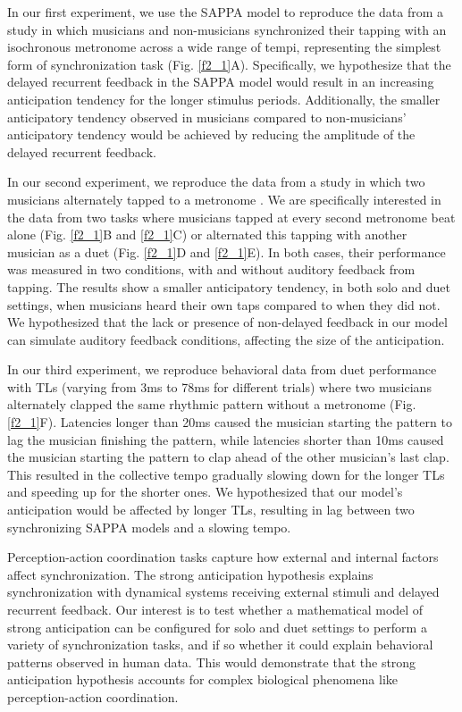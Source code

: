 \documentclass{report}
\begin{document}
In our first experiment, we use the SAPPA model to reproduce the data from a study in which musicians and non-musicians synchronized their tapping with an isochronous metronome across a wide range of tempi, representing the simplest form of synchronization task \cite{repp2007tapping} (Fig.{} \ref{f2_1}A). Specifically, we hypothesize that the delayed recurrent feedback in the SAPPA model would result in an increasing anticipation tendency for the longer stimulus periods. Additionally, the smaller anticipatory tendency observed in musicians compared to non-musicians' anticipatory tendency would be achieved by reducing the amplitude of the delayed recurrent feedback.

In our second experiment, we reproduce the data from a study in which two musicians alternately tapped to a metronome \cite{nowicki2013mutual}. We are specifically interested in the data from two tasks where musicians tapped at every second metronome beat alone (Fig.{} \ref{f2_1}B and \ref{f2_1}C) or alternated this tapping with another musician as a duet (Fig.{} \ref{f2_1}D and \ref{f2_1}E). In both cases, their performance was measured in two conditions, with and without auditory feedback from tapping. The results show a smaller anticipatory tendency, in both solo and duet settings, when musicians heard their own taps compared to when they did not. We hypothesized that the lack or presence of non-delayed feedback in our model can simulate auditory feedback conditions, affecting the size of the anticipation.

In our third experiment, we reproduce behavioral data from duet performance with TLs (varying from 3ms to 78ms for different trials) where two musicians alternately clapped the same rhythmic pattern without a metronome \cite{chafe2010effect} (Fig.{} \ref{f2_1}F). Latencies longer than 20ms caused the musician starting the pattern to lag the musician finishing the pattern, while latencies shorter than 10ms caused the musician starting the pattern to clap ahead of the other musician's last clap. This resulted in the collective tempo gradually slowing down for the longer TLs and speeding up for the shorter ones. We hypothesized that our model's anticipation would be affected by longer TLs, resulting in lag between two synchronizing SAPPA models and a slowing tempo.

Perception-action coordination tasks capture how external and internal factors affect synchronization. The strong anticipation hypothesis explains synchronization with dynamical systems receiving external stimuli and delayed recurrent feedback. Our interest is to test whether a mathematical model of strong anticipation can be configured for solo and duet settings to perform a variety of synchronization tasks, and if so whether it could explain behavioral patterns observed in human data. This would demonstrate that the strong anticipation hypothesis accounts for complex biological phenomena like perception-action coordination.
\end{document}
